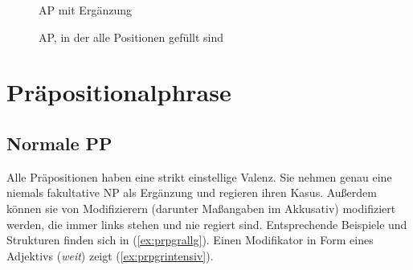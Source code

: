 \begin{figure}
  \centering
  \caption{AP mit Ergänzung}
  \label{fig:erginadjgr}
\end{figure}

\begin{figure}
  \centering
  \caption{AP, in der alle Positionen gefüllt sind}
  \label{fig:adjgrziemlichvoll}
\end{figure}

\section{Präpositionalphrase}

\label{sec:prpgr}

\subsection{Normale PP}



Alle Präpositionen haben eine strikt einstellige Valenz.
Sie nehmen genau eine niemals fakultative NP als Ergänzung und regieren ihren Kasus.
Außerdem können sie von Modifizierern (darunter Maßangaben im Akkusativ) modifiziert werden, die immer links stehen und nie regiert sind.
Entsprechende Beispiele und Strukturen finden sich in (\ref{ex:prpgrallg}).
Einen Modifikator in Form eines Adjektivs (\textit{weit}) zeigt (\ref{ex:prpgrintensiv}).

\begin{exe}
  \ex\label{ex:prpgrallg}
  \begin{xlist}
  \end{xlist}
\end{exe}

